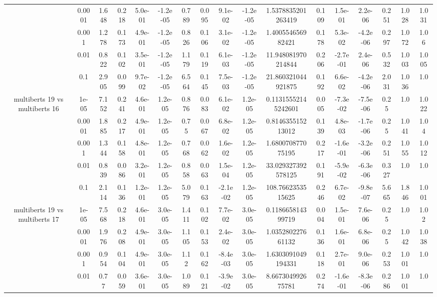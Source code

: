 \begin{tabular}{|c|c|c|c|c|c|c|c|c|c|c|c|c|c|c|c|c|}
 & 0.0001 & 1.648 & 0.218 & 5.0e-01 & -1.2e-05 & 0.789 & 0.095 & 9.1e-02 & -1.2e-05 & 1.5378835201263419 & 0.109 & 1.5e-01 & 2.2e-06 & 0.251 & 1.028 & 1.031 \\
 & 0.001 & 1.278 & 0.173 & 4.9e-01 & -1.2e-05 & 0.826 & 0.106 & 3.1e-02 & -1.2e-05 & 1.400554656982421 & 0.178 & 5.3e-02 & -4.2e-06 & 0.297 & 1.072 & 1.06 \\
 & 0.01 & 0.822 & 0.102 & 3.5e-01 & -1.2e-05 & 1.179 & 0.119 & 6.1e-03 & -1.2e-05 & 11.948081970214844 & 0.206 & -2.7e-01 & 2.4e-06 & 0.532 & 1.003 & 1.005 \\
 & 0.1 & 2.905 & 0.099 & 9.7e-02 & -1.2e-05 & 6.564 & 0.145 & 7.5e-03 & -1.2e-05 & 21.860321044921875 & 0.192 & 6.6e-02 & -4.2e-06 & 2.031 & 1.036 & 1.0 \\
\hline
\multirow{5}{*}{multiberts 19 vs multiberts 16} & 1e-05 & 7.152 & 0.241 & 4.6e-01 & 1.2e-05 & 0.876 & 0.083 & 6.1e-02 & 1.2e-05 & 0.11315552145242601 & 0.005 & -7.3e-02 & -7.5e-06 & 0.25 & 1.0 & 1.022 \\
 & 0.0001 & 1.885 & 0.217 & 4.9e-01 & 1.2e-05 & 0.75 & 0.067 & 6.8e-02 & 1.2e-05 & 0.814635515213012 & 0.139 & 4.8e-03 & -1.7e-06 & 0.25 & 1.041 & 1.04 \\
 & 0.001 & 1.344 & 0.158 & 4.8e-01 & 1.2e-05 & 0.768 & 0.062 & 1.6e-02 & 1.2e-05 & 1.680070877075195 & 0.217 & -1.6e-01 & -3.2e-06 & 0.251 & 1.055 & 1.012 \\
 & 0.01 & 0.839 & 0.086 & 3.2e-01 & 1.2e-05 & 0.858 & 0.063 & 1.5e-04 & 1.2e-05 & 33.029327392578125 & 0.191 & -5.9e-02 & -6.3e-06 & 0.327 & 1.0 & 1.0 \\
 & 0.1 & 2.114 & 0.136 & 1.2e-01 & 1.2e-05 & 5.079 & 0.163 & -2.1e-02 & 1.2e-05 & 108.7662353515625 & 0.246 & 6.7e-02 & -9.8e-07 & 5.665 & 1.846 & 1.001 \\
\hline
\multirow{5}{*}{multiberts 19 vs multiberts 17} & 1e-05 & 7.568 & 0.218 & 4.6e-01 & 3.0e-05 & 1.411 & 0.102 & 7.7e-02 & 3.0e-05 & 0.118665814399719 & 0.004 & 1.5e-01 & 7.6e-06 & 0.25 & 1.0 & 1.02 \\
 & 0.0001 & 1.976 & 0.208 & 4.9e-01 & 3.0e-05 & 1.105 & 0.153 & 2.4e-02 & 3.0e-05 & 1.035280227661132 & 0.136 & 1.6e-01 & 6.8e-06 & 0.25 & 1.042 & 1.038 \\
 & 0.001 & 0.954 & 0.104 & 4.9e-01 & 3.0e-05 & 1.12 & 0.162 & -8.4e-03 & 3.0e-05 & 1.6303091049194331 & 0.118 & 2.7e-01 & 9.0e-06 & 0.253 & 1.001 & 1.0 \\
 & 0.01 & 0.77 & 0.059 & 3.6e-01 & 3.0e-05 & 1.089 & 0.121 & -3.9e-02 & 3.0e-05 & 8.667304992675781 & 0.274 & -1.6e-01 & -8.3e-06 & 0.286 & 1.001 & 1.0 \\

\end{tabular}
